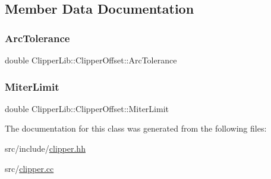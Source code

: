 \subsection{Member Data Documentation}
\mbox{\label{class_clipper_lib_1_1_clipper_offset_a6c1735720b06e6b92dc25891014b2a92}} 
\subsubsection{\texorpdfstring{ArcTolerance}{ArcTolerance}}
{\footnotesize\ttfamily double Clipper\+Lib\+::\+Clipper\+Offset\+::\+Arc\+Tolerance}

\mbox{\label{class_clipper_lib_1_1_clipper_offset_a36b3bf4571e5b831edd584cbcb179246}} 
\subsubsection{\texorpdfstring{MiterLimit}{MiterLimit}}
{\footnotesize\ttfamily double Clipper\+Lib\+::\+Clipper\+Offset\+::\+Miter\+Limit}



The documentation for this class was generated from the following files\+:\begin{DoxyCompactItemize}
\item 
src/include/\mbox{\hyperlink{clipper_8hh}{clipper.\+hh}}\item 
src/\mbox{\hyperlink{clipper_8cc}{clipper.\+cc}}\end{DoxyCompactItemize}
